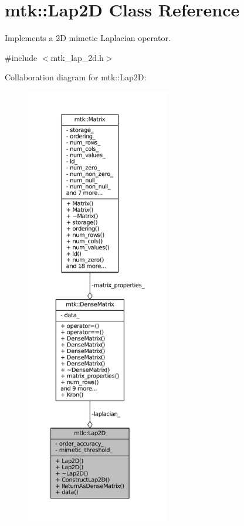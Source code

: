 \hypertarget{classmtk_1_1Lap2D}{\section{mtk\+:\+:Lap2\+D Class Reference}
\label{classmtk_1_1Lap2D}
}


Implements a 2\+D mimetic Laplacian operator.  




{\ttfamily \#include $<$mtk\+\_\+lap\+\_\+2d.\+h$>$}



Collaboration diagram for mtk\+:\+:Lap2\+D\+:\nopagebreak
\begin{figure}[H]
\begin{center}
\leavevmode
\includegraphics[height=550pt]{classmtk_1_1Lap2D__coll__graph}
\end{center}
\end{figure}
